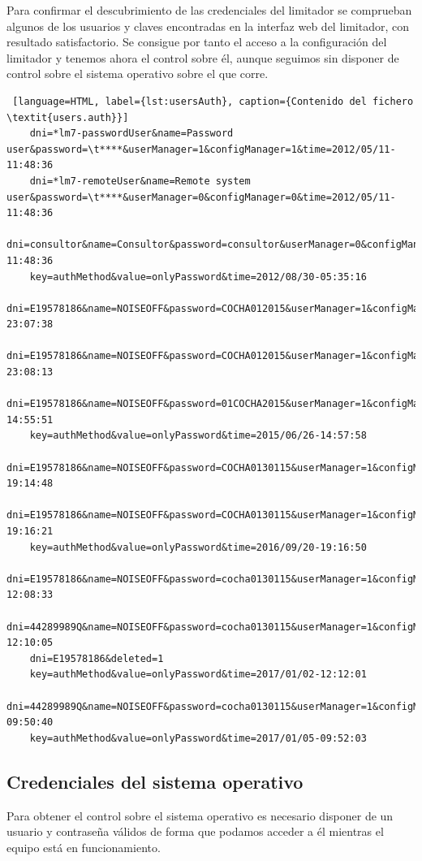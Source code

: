 Para confirmar el descubrimiento de las credenciales del limitador se comprueban algunos de los usuarios y claves encontradas en la interfaz web del limitador, con resultado satisfactorio. Se consigue por tanto el acceso a la configuración del limitador y tenemos ahora el control sobre él, aunque seguimos sin disponer de control sobre el sistema operativo sobre el que corre.\newline

\begin{lstlisting} [language=HTML, label={lst:usersAuth}, caption={Contenido del fichero \textit{users.auth}}]
    dni=*lm7-passwordUser&name=Password user&password=\t****&userManager=1&configManager=1&time=2012/05/11-11:48:36
    dni=*lm7-remoteUser&name=Remote system user&password=\t****&userManager=0&configManager=0&time=2012/05/11-11:48:36
    dni=consultor&name=Consultor&password=consultor&userManager=0&configManager=0&time=2012/05/11-11:48:36
    key=authMethod&value=onlyPassword&time=2012/08/30-05:35:16
    dni=E19578186&name=NOISEOFF&password=COCHA012015&userManager=1&configManager=1&time=2015/06/25-23:07:38
    dni=E19578186&name=NOISEOFF&password=COCHA012015&userManager=1&configManager=1&time=2015/06/25-23:08:13
    dni=E19578186&name=NOISEOFF&password=01COCHA2015&userManager=1&configManager=1&time=2015/06/26-14:55:51
    key=authMethod&value=onlyPassword&time=2015/06/26-14:57:58
    dni=E19578186&name=NOISEOFF&password=COCHA0130115&userManager=1&configManager=1&time=2016/09/20-19:14:48
    dni=E19578186&name=NOISEOFF&password=COCHA0130115&userManager=1&configManager=1&time=2016/09/20-19:16:21
    key=authMethod&value=onlyPassword&time=2016/09/20-19:16:50
    dni=E19578186&name=NOISEOFF&password=cocha0130115&userManager=1&configManager=1&time=2017/01/02-12:08:33
    dni=44289989Q&name=NOISEOFF&password=cocha0130115&userManager=1&configManager=1&time=2017/01/02-12:10:05
    dni=E19578186&deleted=1
    key=authMethod&value=onlyPassword&time=2017/01/02-12:12:01
    dni=44289989Q&name=NOISEOFF&password=cocha0130115&userManager=1&configManager=1&time=2017/01/05-09:50:40
    key=authMethod&value=onlyPassword&time=2017/01/05-09:52:03
\end{lstlisting}

\subsection{Credenciales del sistema operativo}

Para obtener el control sobre el sistema operativo es necesario disponer de un usuario y contraseña válidos de forma que podamos acceder a él mientras el equipo está en funcionamiento.

